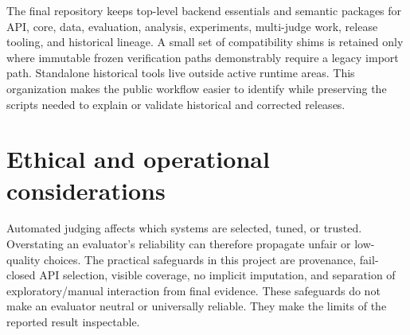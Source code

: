 The final repository keeps top-level backend essentials and semantic packages for API, core, data, evaluation, analysis, experiments, multi-judge work, release tooling, and historical lineage. A small set of compatibility shims is retained only where immutable frozen verification paths demonstrably require a legacy import path. Standalone historical tools live outside active runtime areas. This organization makes the public workflow easier to identify while preserving the scripts needed to explain or validate historical and corrected releases.

\section{Ethical and operational considerations}

Automated judging affects which systems are selected, tuned, or trusted. Overstating an evaluator's reliability can therefore propagate unfair or low-quality choices. The practical safeguards in this project are provenance, fail-closed API selection, visible coverage, no implicit imputation, and separation of exploratory/manual interaction from final evidence. These safeguards do not make an evaluator neutral or universally reliable. They make the limits of the reported result inspectable.
